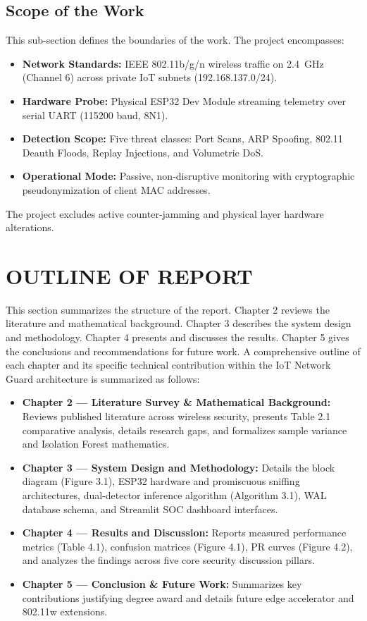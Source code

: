 \documentclass[11pt,a4paper]{report}
\begin{document}
\subsection{Scope of the Work}
This sub-section defines the boundaries of the work. The project encompasses:
\begin{itemize}[leftmargin=*,itemsep=0.5pt,parsep=0pt,topsep=1pt]
    \item \textbf{Network Standards:} IEEE 802.11b/g/n wireless traffic on 2.4~GHz (Channel 6) across private IoT subnets (192.168.137.0/24).
    \item \textbf{Hardware Probe:} Physical ESP32 Dev Module streaming telemetry over serial UART (115200 baud, 8N1).
    \item \textbf{Detection Scope:} Five threat classes: Port Scans, ARP Spoofing, 802.11 Deauth Floods, Replay Injections, and Volumetric DoS.
    \item \textbf{Operational Mode:} Passive, non-disruptive monitoring with cryptographic pseudonymization of client MAC addresses.
\end{itemize}
The project excludes active counter-jamming and physical layer hardware alterations.

\section{OUTLINE OF REPORT}
This section summarizes the structure of the report. Chapter 2 reviews the literature and mathematical background. Chapter 3 describes the system design and methodology. Chapter 4 presents and discusses the results. Chapter 5 gives the conclusions and recommendations for future work.
A comprehensive outline of each chapter and its specific technical contribution within the IoT Network Guard architecture is summarized as follows:
\begin{itemize}[leftmargin=*,itemsep=1pt,parsep=0pt,topsep=1pt]
    \item \textbf{Chapter 2 --- Literature Survey \& Mathematical Background:} Reviews published literature across wireless security, presents Table 2.1 comparative analysis, details research gaps, and formalizes sample variance and Isolation Forest mathematics.
    \item \textbf{Chapter 3 --- System Design and Methodology:} Details the block diagram (Figure 3.1), ESP32 hardware and promiscuous sniffing architectures, dual-detector inference algorithm (Algorithm 3.1), WAL database schema, and Streamlit SOC dashboard interfaces.
    \item \textbf{Chapter 4 --- Results and Discussion:} Reports measured performance metrics (Table 4.1), confusion matrices (Figure 4.1), PR curves (Figure 4.2), and analyzes the findings across five core security discussion pillars.
    \item \textbf{Chapter 5 --- Conclusion \& Future Work:} Summarizes key contributions justifying degree award and details future edge accelerator and 802.11w extensions.
\end{itemize}
\end{document}
